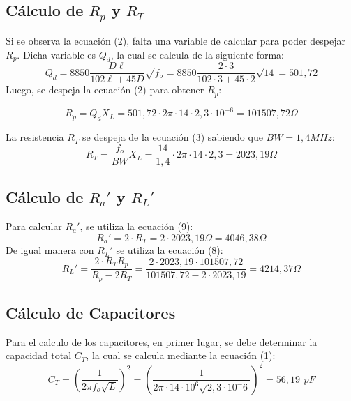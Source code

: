 \subsection{Cálculo de \(R_p\) y \(R_T\) }

Si se observa la ecuación (2), falta una variable de calcular para poder despejar \(R_p\). Dicha variable es \(Q_d\), la cual se calcula de la siguiente forma:
\begin{equation}
    Q_d = 8850\frac{D\ell}{102\ell+45D}\sqrt{f_o} = 8850\frac{2\cdot3}{102\cdot3+45\cdot2}\sqrt{14} = 501,72
\end{equation}
Luego, se despeja la ecuación (2) para obtener  \(R_p\):

\begin{equation}
    R_p = Q_dX_L = 501,72 \cdot 2\pi \cdot14\cdot 2,3 \cdot 10^{-6} = 101507,72 \Omega
\end{equation}


La resistencia \(R_T\) se despeja de la ecuación (3) sabiendo que \(BW = 1,4MHz\):
\begin{equation}
    R_T = \frac{f_o}{BW}X_L = \frac{14}{1,4}\cdot2\pi \cdot14\cdot 2,3 = 2023,19 \Omega
\end{equation}
\newpage
\subsection{Cálculo de \(R_a'\) y \(R_L'\)}
Para calcular \(R_a'\), se utiliza la ecuación (9):
\begin{equation}
    R_a' = 2\cdot R_T = 2 \cdot 2023,19\Omega = 4046,38 \Omega
\end{equation}
De igual manera con \(R_L'\) se utiliza la ecuación (8):
\begin{equation}
    R_L' = \frac{2\cdot R_TR_p}{R_p-2R_T} =  \frac{2\cdot 2023,19 \cdot 101507,72}{101507,72-2\cdot 2023,19} = 4214,37 \Omega
\end{equation}

\subsection{Cálculo de Capacitores}
Para el calculo de los capacitores, en primer lugar, se debe determinar la capacidad total \(C_T\), la cual se calcula mediante la ecuación (1):
\begin{equation}
    C_T = (\frac{1}{2\pi f_o\sqrt{L}})^2 = (\frac{1}{2\pi\cdot 14\cdot10^6\sqrt{2,3\cdot10^-6}})^2 = 56,19 \,\ pF
\end{equation}

